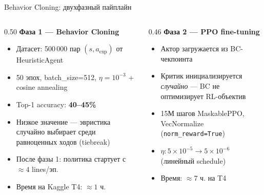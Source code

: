 \documentclass[aspectratio=169]{beamer}
\begin{document}
	\begin{frame}{Behavior Cloning: двухфазный пайплайн}
		\begin{columns}[t]
			\begin{column}{0.50\textwidth}
				\textbf{Фаза 1 — Behavior Cloning}

				\medskip
				\begin{itemize}
					\item Датасет: 500\,000 пар $(s, a_{\text{exp}})$ от HeuristicAgent
					\item 50 эпох, batch\_size=512, $\eta=10^{-3}$ + cosine annealing
					\item Top-1 accuracy: \textbf{40--45\%}
					\item Низкое значение — эвристика случайно выбирает среди равноценных ходов (tiebreak)
					\item После фазы 1: политика стартует с $\approx4$ lines/эп.
					\item Время на Kaggle T4: $\approx1$ ч.
				\end{itemize}
			\end{column}
			\begin{column}{0.46\textwidth}
				\textbf{Фаза 2 — PPO fine-tuning}

				\medskip
				\begin{itemize}
					\item Актор загружается из BC-чекпоинта
					\item Критик инициализируется \emph{случайно} — BC не оптимизирует RL-объектив
					\item 15М шагов MaskablePPO, VecNormalize (\texttt{norm\_reward=True})
					\item $\eta: 5\times10^{-5} \to 5\times10^{-6}$ (линейный schedule)
					\item Время: $\approx7$ ч. на T4
				\end{itemize}
			\end{column}
		\end{columns}
	\end{frame}
\end{document}

